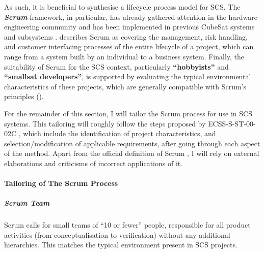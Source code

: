 \documentclass[a4paper,nobib,justified,final]{tufte-book}
\begin{document}
As such, it is beneficial to synthesise a lifecycle process model for \acs{SCS}. The \textbf{\emph{Scrum}} framework, in particular, has already gathered attention in the hardware engineering community \autocite{bottAnalysisTheoriesSupporting2019,doveFundamentalsAgileSystems2014} and has been implemented in previous CubeSat systems and subsystems \autocite{honore-livermoreDigitalEngineeringDevelopment2022,garzanitiEffectivenessScrumMethodology2019}. \citeauthor{boehmBalancingAgilityDiscipline2004} \autocite{boehmBalancingAgilityDiscipline2004} describes Scrum as covering the management, risk handling, and customer interfacing processes of the entire lifecycle of a project, which can range from a system built by an individual to a business system. Finally, the suitability of Scrum for the \acs{SCS} context, particularly \textbf{``hobbyists''} and \textbf{``smallsat developers''}, is supported by evaluating the typical environmental characteristics of these projects, which are generally compatible with Scrum's principles ().

For the remainder of this section, I will tailor the Scrum process for use in \ac{SCS} systems. This tailoring will roughly follow the steps proposed by ECSS-S-ST-00-02C \autocite{ECSS-S-ST-00-02C}, which include the identification of project characteristics, and selection/modification of applicable requirements, after going through each aspect of the method. Apart from the official definition of Scrum \cite{schwaverDefinitiveGuideScrum2020}, I will rely on external elaborations \cite{boehmBalancingAgilityDiscipline2004} and criticisms \autocite{kustersScreamGuide2020,jeffriesDarkScrum2016} of incorrect applications of it.

\paragraph{Tailoring of The Scrum Process}

\subparagraph{Scrum Team}
Scrum calls for small teams of ``10 or fewer'' people, responsible for all product activities (from conceptualisation to verification) without any additional hierarchies. This matches the typical environment present in \acs{SCS} projects.
\end{document}

